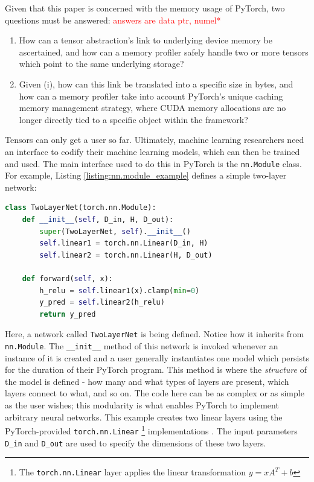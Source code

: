 \documentclass[12pt,letterpaper]{article}
\newcommand\myworries[1]{\textcolor{red}{#1}}
\begin{document}
Given that this paper is concerned with the memory usage of PyTorch, two questions must be answered: \myworries{answers are  data ptr, numel*}
\begin{enumerate}[label=(\roman*)]
  \item How can a tensor abstraction's link to underlying device memory be ascertained, and how can a memory profiler safely handle two or more tensors which point to the same underlying storage?
  \item Given (i), how can this link be translated into a specific size in bytes, and how can a memory profiler take into account PyTorch's unique caching memory management strategy, where CUDA memory allocations are no longer directly tied to a specific object within the framework?
\end{enumerate}

%
%

\label{sec:models_in_pytorch}
Tensors can only get a user so far. Ultimately, machine learning researchers need an interface to codify their machine learning models, which can then be trained and used. The main interface used to do this in PyTorch is the \texttt{nn.Module} class. For example, Listing \ref{listing:nn.module_example} defines a simple two-layer network:
\par 
\begin{lstlisting}[language=Python, caption={Definition of a simple two-layer neural network from the PyTorch documentation \cite{pytorch_tutorial}}, label={listing:nn.module_example}]
class TwoLayerNet(torch.nn.Module):
    def __init__(self, D_in, H, D_out):
        super(TwoLayerNet, self).__init__()
        self.linear1 = torch.nn.Linear(D_in, H)
        self.linear2 = torch.nn.Linear(H, D_out)

    def forward(self, x):
        h_relu = self.linear1(x).clamp(min=0)
        y_pred = self.linear2(h_relu)
        return y_pred
\end{lstlisting}
Here, a network called \texttt{TwoLayerNet} is being defined. Notice how it inherits from \texttt{nn.Module}. The \texttt{\_\_init\_\_} method of this network is invoked whenever an instance of it is created and a user generally instantiates one model which persists for the duration of their PyTorch program. This method is where the \textit{structure} of the model is defined - how many and what types of layers are present, which layers connect to what, and so on. The code here can be as complex or as simple as the user wishes; this modularity is what enables PyTorch to implement arbitrary neural networks. This example creates two linear layers using the PyTorch-provided \texttt{torch.nn.Linear} \footnote{The \texttt{torch.nn.Linear} layer applies the linear transformation $y=xA^T + b$} implementations \cite{pytorch_docs}. The input parameters \texttt{D\_in} and \texttt{D\_out} are used to specify the dimensions of these two layers.
\par 
\end{document}
